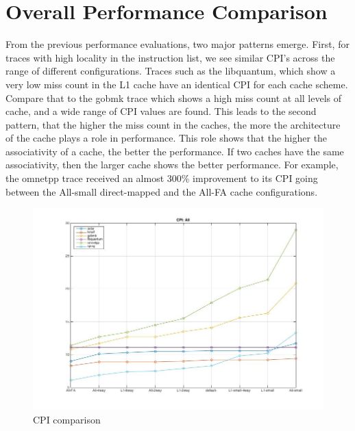 \documentclass[11pt,titlepage]{article}
\begin{document}
    \section{Overall Performance Comparison}
    From the previous performance evaluations, two major patterns emerge. First, for traces with high locality in the instruction list, we see similar CPI's across the range of different configurations. Traces such as the libquantum, which show a very low miss count in the L1 cache have an identical CPI for each cache scheme. Compare that to the gobmk trace which shows a high miss count at all levels of cache, and a wide range of CPI values are found. This leads to the second pattern, that the higher the miss count in the caches, the more the architecture of the cache plays a role in performance. This role shows that the higher the associativity of a cache, the better the performance. If two caches have the same associativity, then the larger cache shows the better performance. For example, the omnetpp trace received an almost 300\% improvement to its CPI going between the All-small direct-mapped and the All-FA cache configurations.
     \begin{figure}[H]
      \centering
      \includegraphics[scale=0.45]{CPIall}
      \caption{CPI comparison}
      \label{fig:CPIall}
    \end{figure}
\end{document}
